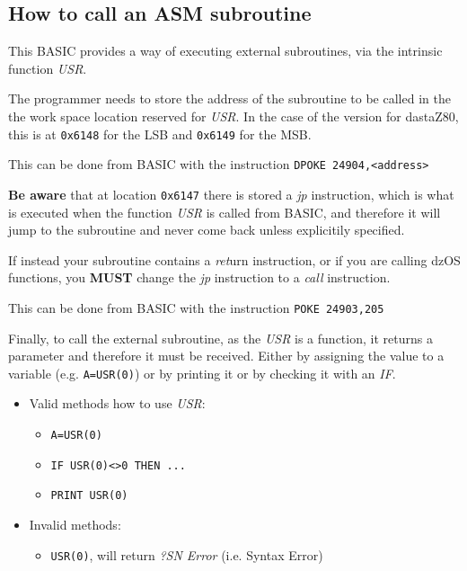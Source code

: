     \subsection{How to call an ASM subroutine}

    This BASIC provides a way of executing external subroutines, via the
    intrinsic function \textit{USR}.

    The programmer needs to store the address of the subroutine to be called in
    the the work space location reserved for \textit{USR}. In the case of the
    version for dastaZ80, this is at \texttt{0x6148} for the LSB and
    \texttt{0x6149} for the MSB.

    This can be done from BASIC with the instruction \texttt{DPOKE 24904,<address>}

    \textbf{Be aware} that at location \texttt{0x6147} there is stored a
    \textit{jp} instruction, which is what is executed when the function
    \textit{USR} is called from BASIC, and therefore it will jump to the
    subroutine and never come back unless explicitily specified.

    If instead your subroutine contains a \textit{ret}urn instruction, or if you
    are calling dzOS functions, you \textbf{MUST} change the \textit{jp}
    instruction to a \textit{call} instruction.

    This can be done from BASIC with the instruction \texttt{POKE 24903,205}

    Finally, to call the external subroutine, as the \textit{USR} is a function,
    it returns a parameter and therefore it must be received. Either by assigning
    the value to a variable (e.g. \texttt{A=USR(0)}) or by printing it or by
    checking it with an \textit{IF}.

    \begin{itemize}
        \item Valid methods how to use \textit{USR}:
        \begin{itemize}
            \item \texttt{A=USR(0)}
            \item \texttt{IF USR(0)<>0 THEN ...}
            \item \texttt{PRINT USR(0)}
        \end{itemize}
        \item Invalid methods:
        \begin{itemize}
            \item \texttt{USR(0)}, will return \textit{?SN Error} (i.e. Syntax Error)
        \end{itemize}
    \end{itemize}

